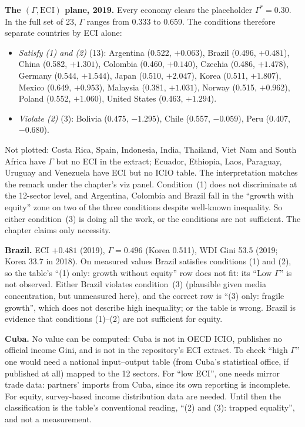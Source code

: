 \documentclass[../solutions_manual.tex]{subfiles}
\begin{document}
 \textbf{The $(\Gamma, \text{ECI})$ plane, 2019.} Every economy clears the placeholder $\Gamma^* = 0.30$. In the full set of 23, $\Gamma$ ranges from 0.333 to 0.659. The conditions therefore separate countries by ECI alone:
\begin{itemize}
\item \emph{Satisfy (1) and (2)} (13): Argentina (0.522, $+0.063$), Brazil (0.496, $+0.481$), China (0.582, $+1.301$), Colombia (0.460, $+0.140$), Czechia (0.486, $+1.478$), Germany (0.544, $+1.544$), Japan (0.510, $+2.047$), Korea (0.511, $+1.807$), Mexico (0.649, $+0.953$), Malaysia (0.381, $+1.031$), Norway (0.515, $+0.962$), Poland (0.552, $+1.060$), United States (0.463, $+1.294$).
\item \emph{Violate (2)} (3): Bolivia (0.475, $-1.295$), Chile (0.557, $-0.059$), Peru (0.407, $-0.680$).
\end{itemize}
Not plotted: Costa Rica, Spain, Indonesia, India, Thailand, Viet Nam and South Africa have $\Gamma$ but no ECI in the extract; Ecuador, Ethiopia, Laos, Paraguay, Uruguay and Venezuela have ECI but no ICIO table. The interpretation matches the remark under the chapter's viz panel. Condition~(1) does not discriminate at the 12-sector level, and Argentina, Colombia and Brazil fall in the ``growth with equity'' zone on two of the three conditions despite well-known inequality. So either condition~(3) is doing all the work, or the conditions are not sufficient. The chapter claims only necessity.


 \textbf{Brazil.} ECI $+0.481$ (2019), $\Gamma = 0.496$ (Korea 0.511), WDI Gini 53.5 (2019; Korea 33.7 in 2018). On measured values Brazil satisfies conditions (1) and (2), so the table's ``(1) only: growth without equity'' row does not fit: its ``Low $\Gamma$'' is not observed. Either Brazil violates condition~(3) (plausible given media concentration, but unmeasured here), and the correct row is ``(3) only: fragile growth'', which does not describe high inequality; or the table is wrong. Brazil is evidence that conditions (1)--(2) are not sufficient for equity.

 \textbf{Cuba.} No value can be computed: Cuba is not in OECD ICIO, publishes no official income Gini, and is not in the repository's ECI extract. To check ``high $\Gamma$'' one would need a national input--output table (from Cuba's statistical office, if published at all) mapped to the 12 sectors. For ``low ECI'', one needs mirror trade data: partners' imports from Cuba, since its own reporting is incomplete. For equity, survey-based income distribution data are needed. Until then the classification is the table's conventional reading, ``(2) and (3): trapped equality'', and not a measurement.
\end{document}
